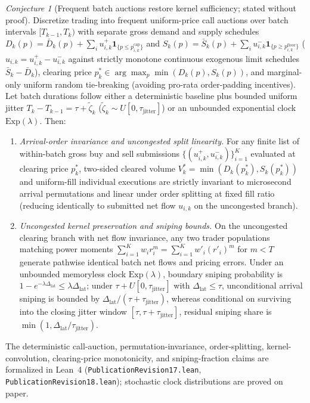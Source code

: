 \documentclass[12pt]{article}
\theoremstyle{definition}
\theoremstyle{remark}
\newtheorem{conjecture}[theorem]{Conjecture}
\begin{document}
\begin{conjecture}[Frequent batch auctions restore kernel sufficiency; stated without proof]\label{thm:batch_restoration}
Discretize trading into frequent uniform-price call auctions \citep{budish2015} over batch intervals $[T_{k-1}, T_k)$ with separate gross demand and supply schedules $D_k(p) = \bar{D}_k(p) + \sum_i u_{i,k}^+ \mathbf{1}_{\{p \le p^{\mathrm{cap}}_{i,k}\}}$ and $S_k(p) = \bar{S}_k(p) + \sum_i u_{i,k}^- \mathbf{1}_{\{p \ge p^{\mathrm{floor}}_{i,k}\}}$ ($u_{i,k} = u_{i,k}^+ - u_{i,k}^-$ against strictly monotone continuous exogenous limit schedules $\bar{S}_k - \bar{D}_k$), clearing price $p_k^* \in \arg\max_p \min(D_k(p), S_k(p))$, and marginal-only \citet{budish2015} uniform random tie-breaking (avoiding pro-rata order-padding incentives). Let batch durations follow either a deterministic baseline plus bounded uniform jitter $T_k - T_{k-1} = \tau + \tilde{\zeta}_k$ ($\tilde\zeta_k \sim U[0, \tau_{\mathrm{jitter}}]$) or an unbounded exponential clock $\mathrm{Exp}(\lambda)$. Then:
\begin{enumerate}
  \item[(i)] \emph{Arrival-order invariance and uncongested split linearity.} For any finite list of within-batch gross buy and sell submissions $\{(u_{i,k}^+, u_{i,k}^-)\}_{i=1}^K$ evaluated at clearing price $p_k^*$, two-sided cleared volume $V_k^* = \min(D_k(p_k^*), S_k(p_k^*))$ and uniform-fill individual executions are strictly invariant to microsecond arrival permutations and linear under order splitting at fixed fill ratio (reducing identically to submitted net flow $u_{i,k}$ on the uncongested branch).
  \item[(ii)] \emph{Uncongested kernel preservation and sniping bounds.} On the uncongested clearing branch with net flow invariance, any two trader populations matching power moments $\sum_{i=1}^K w_i r_i^m = \sum_{i=1}^K w'_i (r'_i)^m$ for $m < T$ generate pathwise identical batch net flows and pricing errors. Under an unbounded memoryless clock $\mathrm{Exp}(\lambda)$, boundary sniping probability is $1 - e^{-\lambda \Delta_{\mathrm{lat}}} \le \lambda \Delta_{\mathrm{lat}}$; under $\tau + U[0, \tau_{\mathrm{jitter}}]$ with $\Delta_{\mathrm{lat}} \le \tau$, unconditional arrival sniping is bounded by $\Delta_{\mathrm{lat}}/(\tau + \tau_{\mathrm{jitter}})$, whereas conditional on surviving into the closing jitter window $[\tau, \tau+\tau_{\mathrm{jitter}}]$, residual sniping share is $\min(1, \Delta_{\mathrm{lat}}/\tau_{\mathrm{jitter}})$.
\end{enumerate}
\end{conjecture}
The deterministic call-auction, permutation-invariance, order-splitting, kernel-convolution, clearing-price monotonicity, and sniping-fraction claims are formalized in Lean~4 (\nolinkurl{PublicationRevision17.lean}, \nolinkurl{PublicationRevision18.lean}); stochastic clock distributions are proved on paper.
\end{document}
